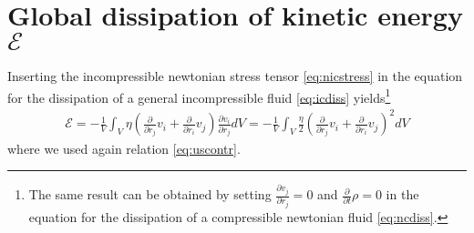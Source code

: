 \documentclass[a4paper,
					fontsize=12pt,
					twoside,
					pagesize,
					cleardoublepage=plain,
					headsepline,
					bibliography=totoc
					]{scrbook}
\newcommand{\lra}[1]{{ \left( #1 \right) }}
\newcommand{\pd}[1]{\frac{\partial}{\partial #1}}
\newcommand{\ppd}[2]{\frac{\partial #2}{\partial #1}}
\begin{document}
\section{Global dissipation of kinetic energy $\mathcal{E}$}\label{nicdiss}
Inserting the incompressible newtonian stress tensor \eqref{eq:nicstress} 
in the equation for the dissipation of a general incompressible fluid
\ref{eq:icdiss} yields\footnote{The same result can be
obtained by setting $\ppd{r_j}{v_j}=0$ and $\pd{t}\rho=0$ in the equation for
the dissipation of a compressible newtonian fluid \eqref{eq:ncdiss}.}
\begin{align}
\mathcal{E} 
=-\frac{1}{V} \int_V  \eta\lra{\pd{r_j}v_i+\pd{r_i}v_j}\ppd{r_j}{v_i} dV
=-\frac{1}{V} \int_V \frac{\eta}{2}\lra{\pd{r_j}v_i+\pd{r_i}v_j}^2 dV
\end{align}
where we used again relation \ref{eq:uscontr}.
\end{document}
